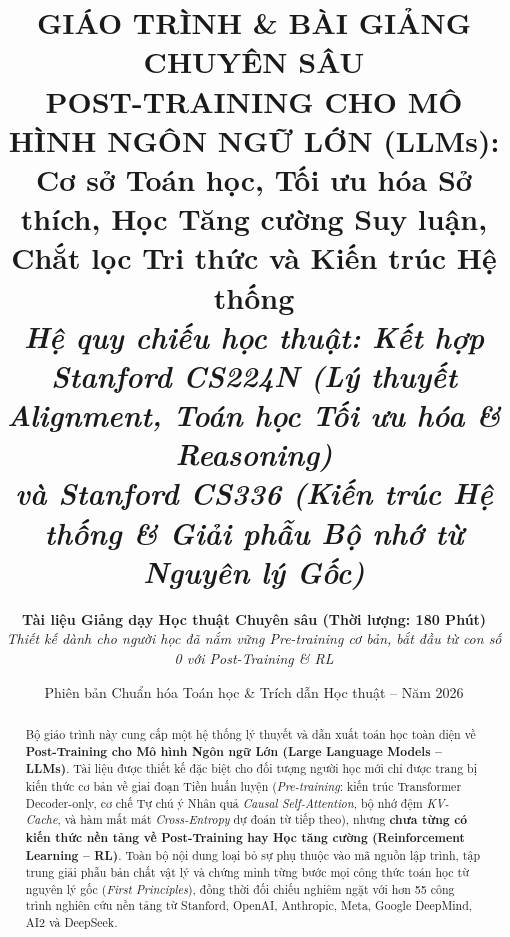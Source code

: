 \documentclass[11pt,a4paper,oneside]{report}
\title{
    \vspace{-1.5cm}
    {\Large \textbf{GIÁO TRÌNH \& BÀI GIẢNG CHUYÊN SÂU}}\\[0.4cm]
    {\LARGE \textbf{\textcolor{stanfordred}{POST-TRAINING CHO MÔ HÌNH NGÔN NGỮ LỚN (LLMs):}}}\\[0.2cm]
    {\Large \textbf{Cơ sở Toán học, Tối ưu hóa Sở thích, Học Tăng cường Suy luận,\\Chắt lọc Tri thức và Kiến trúc Hệ thống}}\\[0.8cm]
    {\normalsize \textit{Hệ quy chiếu học thuật: Kết hợp Stanford CS224N (Lý thuyết Alignment, Toán học Tối ưu hóa \& Reasoning)\\và Stanford CS336 (Kiến trúc Hệ thống \& Giải phẫu Bộ nhớ từ Nguyên lý Gốc)}}
}
\author{
    \textbf{Tài liệu Giảng dạy Học thuật Chuyên sâu (Thời lượng: 180 Phút)}\\
    \textit{Thiết kế dành cho người học đã nắm vững Pre-training cơ bản, bắt đầu từ con số 0 với Post-Training \& RL}
}
\date{Phiên bản Chuẩn hóa Toán học \& Trích dẫn Học thuật -- Năm 2026}
\theoremstyle{plain}
\theoremstyle{definition}
\theoremstyle{remark}
\begin{document}
\maketitle

\begin{abstract}
\noindent
Bộ giáo trình này cung cấp một hệ thống lý thuyết và dẫn xuất toán học toàn diện về \textbf{Post-Training cho Mô hình Ngôn ngữ Lớn (Large Language Models -- LLMs)}. Tài liệu được thiết kế đặc biệt cho đối tượng người học mới chỉ được trang bị kiến thức cơ bản về giai đoạn Tiền huấn luyện (\textit{Pre-training}: kiến trúc Transformer Decoder-only, cơ chế Tự chú ý Nhân quả \textit{Causal Self-Attention}, bộ nhớ đệm \textit{KV-Cache}, và hàm mất mát \textit{Cross-Entropy} dự đoán từ tiếp theo), nhưng \textbf{chưa từng có kiến thức nền tảng về Post-Training hay Học tăng cường (Reinforcement Learning -- RL)}. Toàn bộ nội dung loại bỏ sự phụ thuộc vào mã nguồn lập trình, tập trung giải phẫu bản chất vật lý và chứng minh từng bước mọi công thức toán học từ nguyên lý gốc (\textit{First Principles}), đồng thời đối chiếu nghiêm ngặt với hơn 55 công trình nghiên cứu nền tảng từ Stanford, OpenAI, Anthropic, Meta, Google DeepMind, AI2 và DeepSeek.


\end{abstract}
\end{document}
